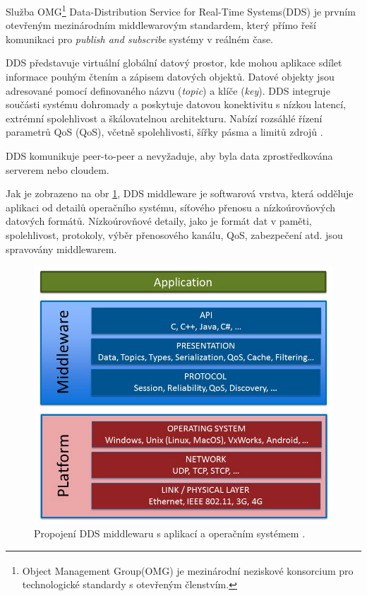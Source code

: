 Služba OMG\footnote{Object Management Group\textsuperscript \textregistered (OMG\textsuperscript \textregistered) je mezinárodní neziskové konsorcium pro technologické standardy s otevřeným členstvím.} Data-Distribution Service for Real-Time Systems\textsuperscript \textregistered (\acs{DDS}) je prvním otevřeným mezinárodním middlewarovým standardem, který přímo řeší komunikaci pro \textit{publish and subscribe} systémy v reálném čase.

\acs{DDS} představuje virtuální globální datový prostor, kde mohou aplikace sdílet informace pouhým čtením a zápisem datových objektů. Datové objekty jsou adresované pomocí definovaného názvu (\textit{topic}) a klíče (\textit{key}). \acs{DDS} integruje součásti systému dohromady a poskytuje datovou konektivitu s nízkou latencí, extrémní spolehlivost a škálovatelnou architekturu. Nabízí rozsáhlé řízení parametrů \acs{QoS} (\acl{QoS}), včetně spolehlivosti, šířky pásma a limitů zdrojů \cite{DDS_Def}. 

\acs{DDS} komunikuje peer-to-peer a nevyžaduje, aby byla data zprostředkována serverem nebo cloudem. 

Jak je zobrazeno na obr \ref{fig:DDSmiddleware}, \acs{DDS} middleware je softwarová vrstva, která odděluje aplikaci od detailů operačního systému, síťového přenosu a nízkoúrovňových datových formátů. Nízkoúrovňové detaily, jako je formát dat v paměti, spolehlivost, protokoly, výběr přenosového kanálu, \acs{QoS}, zabezpečení atd. jsou spravovány middlewarem. 

\begin{figure}[!ht]
  \begin{center}
    \includegraphics[scale=0.4]{obrazky/DDS1}
  \end{center}
  \caption[Propojení \acs{DDS} middlewaru s aplikací a operačním systémem]{Propojení \acs{DDS} middlewaru s aplikací a operačním systémem \cite{DDS_Main}.}
  \label{fig:DDSmiddleware}
\end{figure}

